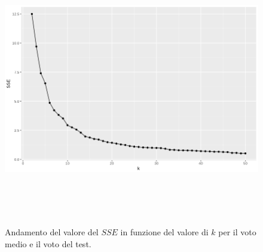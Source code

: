 \documentclass[12pt]{article}
\begin{document}
\begin{figure}[H]
	\centering
	\includegraphics[width=\textwidth, height=12cm,keepaspectratio]{img/k-sse-voto_medio-test.png}
	\caption{Andamento del valore del $SSE$ in funzione del valore di $k$ per il voto medio e il voto del test.}
	\label{fig:k-sse3}
\end{figure}
\end{document}

